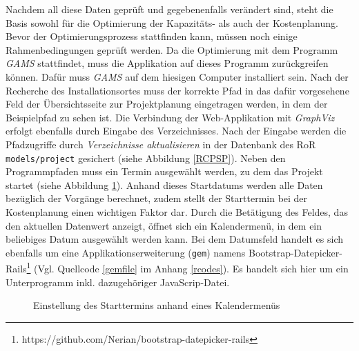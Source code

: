 \documentclass[a4paper,12pt,parskip,bibtotoc,liststotoc]{article}
\begin{document}
Nachdem all diese Daten geprüft und gegebenenfalls verändert sind, steht die Basis sowohl für die Optimierung der Kapazitäts- als auch der Kostenplanung. Bevor der Optimierungsprozess stattfinden kann, müssen noch einige Rahmenbedingungen geprüft werden. Da die Optimierung mit dem Programm \textit{GAMS} stattfindet, muss die Applikation auf dieses Programm zurückgreifen können. Dafür muss \textit{GAMS} auf dem hiesigen Computer installiert sein. Nach der Recherche des Installationsortes muss der korrekte Pfad in das dafür vorgesehene Feld der Übersichtsseite zur Projektplanung eingetragen werden, in dem der Beispielpfad zu sehen ist. Die Verbindung der Web-Applikation mit \textit{GraphViz} erfolgt ebenfalls durch Eingabe des Verzeichnisses. Nach der Eingabe werden die Pfadzugriffe durch \textit{Verzeichnisse aktualisieren} in der Datenbank des RoR \texttt{models/project} gesichert (siehe Abbildung \ref{RCPSP}). Neben den Programmpfaden muss ein Termin ausgewählt werden, zu dem das Projekt startet (siehe Abbildung \ref{Startdatum}). Anhand dieses Startdatums werden alle Daten bezüglich der Vorgänge berechnet, zudem stellt der Starttermin bei der Kostenplanung einen wichtigen Faktor dar. Durch die Betätigung des Feldes, das den aktuellen Datenwert anzeigt, öffnet sich ein Kalendermenü, in dem ein beliebiges Datum ausgewählt werden kann. Bei dem Datumsfeld handelt es sich ebenfalls um eine Applikationserweiterung (\texttt{gem}) namens \glqq Bootstrap-Datepicker-Rails\grqq\footnote{https://github.com/Nerian/bootstrap-datepicker-rails} (Vgl. Quellcode \ref{gemfile} im Anhang \ref{rcodes}). Es handelt sich hier um ein Unterprogramm inkl. dazugehöriger JavaScrip-Datei. \\  

\begin{figure}[h!]
  \begin{center}
    \caption{Einstellung des Starttermins anhand eines Kalendermenüs}  \label{Startdatum}
  \end{center}
\end{figure}
\end{document}
